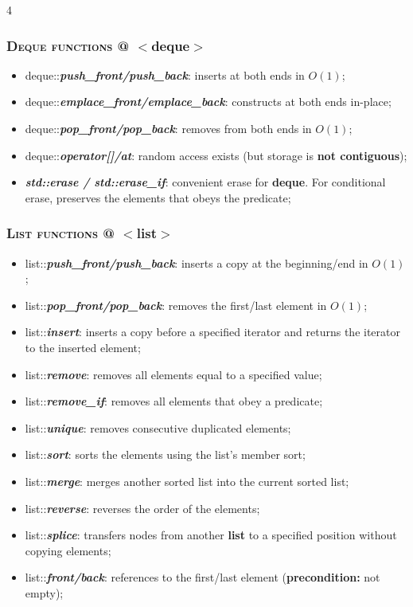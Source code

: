 \documentclass[10pt]{article}
\begin{document}
\begin{multicols*}{4}
{\subsubsection*{\textsc{Deque functions} @ $<$deque$>$} 
\begin{itemize}[leftmargin=*,topsep=0.25pt]
  \setlength\itemsep{-1.8pt}
  \item deque::\emph{\textbf{push\_front/push\_back}}: inserts at both ends in $O(1)$;
  \item deque::\emph{\textbf{emplace\_front/emplace\_back}}: constructs at both ends in-place;
  \item deque::\emph{\textbf{pop\_front/pop\_back}}: removes from both ends in $O(1)$;
  \item deque::\emph{\textbf{operator[]/at}}: random access exists (but storage is \textbf{not contiguous});
  \item \emph{\textbf{std::erase / std::erase\_if}}: convenient erase for \textbf{deque}. For conditional erase, preserves the elements that obeys the predicate;
\end{itemize}

\subsubsection*{\textsc{List functions} @ $<$list$>$} 
\begin{itemize}[leftmargin=*,topsep=0.25pt]
  \setlength\itemsep{-1.8pt}
  \item list::\emph{\textbf{push\_front/push\_back}}: inserts a copy at the beginning/end in $O(1)$;
  \item list::\emph{\textbf{pop\_front/pop\_back}}: removes the first/last element in $O(1)$;
  \item list::\emph{\textbf{insert}}: inserts a copy before a specified iterator and returns the iterator to the inserted element;
  \item list::\emph{\textbf{remove}}: removes all elements equal to a specified value;
  \item list::\emph{\textbf{remove\_if}}: removes all elements that obey a predicate;
  \item list::\emph{\textbf{unique}}: removes consecutive duplicated elements;
  \item list::\emph{\textbf{sort}}: sorts the elements using the list's member sort;
  \item list::\emph{\textbf{merge}}: merges another sorted list into the current sorted list;
  \item list::\emph{\textbf{reverse}}: reverses the order of the elements;
  \item list::\emph{\textbf{splice}}: transfers nodes from another \textbf{list} to a specified position without copying elements;
  \item list::\emph{\textbf{front/back}}: references to the first/last element (\textbf{precondition:} not empty);
\end{itemize}

}
\end{multicols*}
\end{document}
